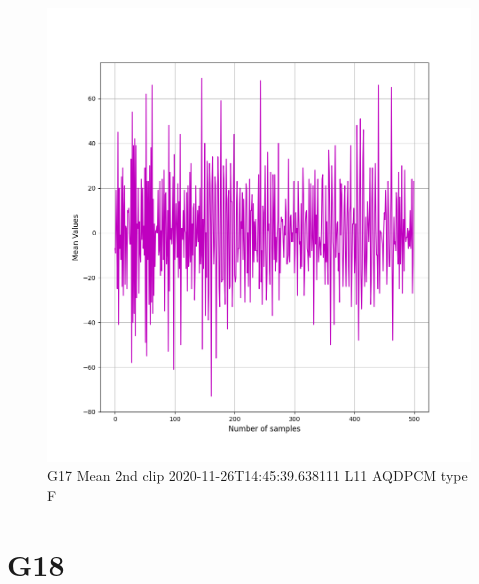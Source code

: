 \documentclass[hidelinks, 12pt, a4paper]{article}
\begin{document}
\begin{figure}[h!]
\centering
	\includegraphics[height=.4\textheight, width=\textwidth]{assets/session1/g17.png}
    \caption{G17 Mean 2nd clip  2020-11-26T14:45:39.638111 L11 AQDPCM type F}
\end{figure}



\section{G18}
\end{document}
